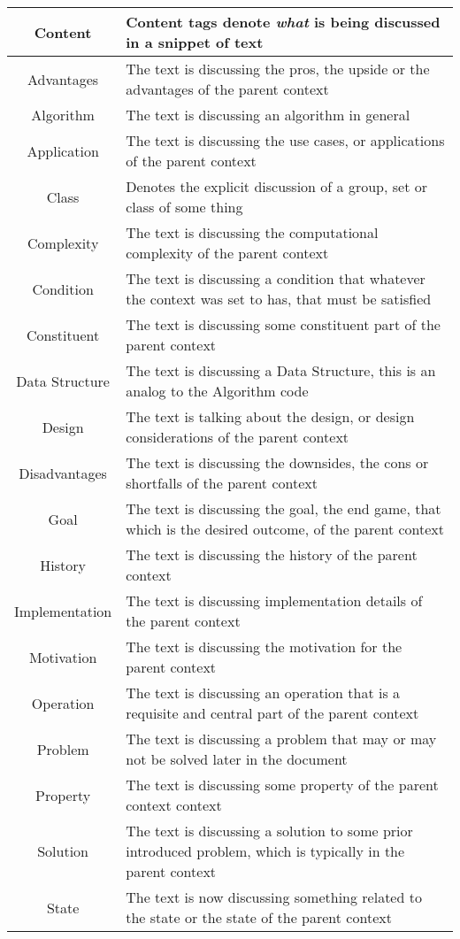 \begin{table}[h!]
\begin{tabular}{c p{1.8\linewidth}}
    
    \textbf{Content} & Content tags denote \emph{what} is being discussed in a snippet of text \\
    \hline
    Advantages & The text is discussing the pros, the upside or the advantages of the parent context \\
    Algorithm & The text is discussing an algorithm in general \\
    Application &  The text is discussing the use cases, or applications of the parent context\\
    Class & Denotes the explicit discussion of a group, set or class of some thing\\
    Complexity & The text is discussing the computational complexity of the parent context\\
    Condition & The text is discussing a condition that whatever the context was set to has, that must be satisfied\\
    Constituent & The text is discussing some constituent part of the parent context\\
    Data Structure & The text is discussing a Data Structure, this is an analog to the Algorithm code\\
    Design & The text is talking about the design, or design considerations of the parent context\\
    Disadvantages & The text is discussing the downsides, the cons or shortfalls of the parent context\\
    Goal & The text is discussing the goal, the end game, that which is the desired outcome, of the parent context\\
    History & The text is discussing the history of the parent context\\
    Implementation & The text is discussing implementation details of the parent context\\
    Motivation & The text is discussing the motivation for the parent context\\
    Operation & The text is discussing an operation that is a requisite and central part of the parent context\\
    Problem & The text is discussing a problem that may or may not be solved later in the document\\
    Property & The text is discussing some property of the parent context context\\
    Solution & The text is discussing a solution to some prior introduced problem, which is typically in the parent context\\
    State & The text is now discussing something related to the state or the state of the parent context\\


\end{tabular}
\end{table}
